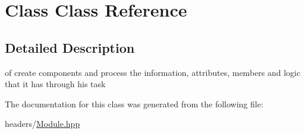 \hypertarget{class_class}{}\section{Class Class Reference}
\label{class_class}


\subsection{Detailed Description}
of create components and process the information, attributes, members and logic that it has through his task 

The documentation for this class was generated from the following file\+:\begin{DoxyCompactItemize}
\item 
headers/\mbox{\hyperlink{_module_8hpp}{Module.\+hpp}}\end{DoxyCompactItemize}
